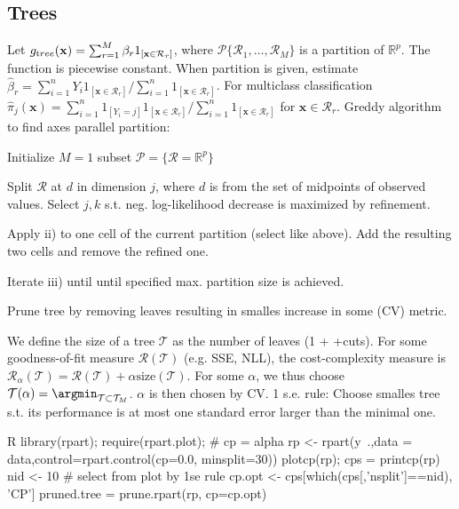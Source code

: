 \subsection{Trees}%
\label{sub:trees}
\begin{sectionbox}\nospacing{}
  Let $g_{\textrm tree}(\mathbf{x}) = \sum_{r=1}^{M}\beta_r 1_{[\mathbf{x}\in \mathcal{R}_r]}$, where $\mathcal{P} \{\mathcal{R}_1,\dots, \mathcal{R}_M\}$ is a partition of $\mathbb{R}^p$.
  The function is piecewise constant.
  When partition is given, estimate $\hat{\beta}_r = \sum_{i=1}^{n}Y_i 1_{[\mathbf{x}\in \mathcal{R}_r]}/\sum_{i=1}^{n}1_{[\mathbf{x}\in \mathcal{R}_r]}$.
  For multiclass classification $\hat{\pi}_j(\mathbf{x}) = \sum_{i=1}^{n}1_{[Y_i =j]} 1_{[\mathbf{x}\in \mathcal{R}_r]}/\sum_{i=1}^{n}1_{[\mathbf{x}\in \mathcal{R}_r]}$ for $\mathbf{x} \in \mathcal{R}_r$.
  Greddy algorithm to find axes parallel partition:
  \begin{enumeratenosep}[label=\roman*]
    \item Initialize $M=1$ subset $\mathcal{P} = \{\mathcal{R} = \mathbb{R}^p\}$
    \item Split $\mathcal{R}$ at $d$ in dimension $j$, where $d$ is from the set of midpoints of observed values.
      Select $j,k$ s.t. neg. log-likelihood decrease is maximized by refinement.
    \item Apply ii) to one cell of the current partition (select like above).
      Add the resulting two cells and remove the refined one. 
    \item Iterate iii) until until specified max. partition size is achieved.
    \item Prune tree by removing leaves resulting in smalles increase in some (CV) metric.
  \end{enumeratenosep}
  We define the size of a tree $\mathcal{T}$ as the number of leaves (1 + +cuts).
  For some goodness-of-fit measure $\mathcal{R}(\mathcal{T})$ (e.g. SSE, NLL), the cost-complexity measure is $\mathcal{R}_{\alpha}(\mathcal{T})=\mathcal{R}(\mathcal{T}) + \alpha \text{size}(\mathcal{T}) $.
  For some $\alpha$, we thus choose $\mathcal{T}(\alpha) = \argmin_{\mathcal{T}\subset\mathcal{T}_M}$.
  $\alpha$ is then chosen by CV. 1 s.e. rule: Choose smalles tree s.t. its performance is at most one standard error larger than the minimal one. 
\end{sectionbox}
\begin{mintlinebox}{R}
  library(rpart); require(rpart.plot); 
  # cp = alpha
  rp <- rpart(y~.,data = data,control=rpart.control(cp=0.0, minsplit=30))
  plotcp(rp); cps = printcp(rp)
  nid <- 10 # select from plot by 1se rule
  cp.opt <- cps[which(cps[,'nsplit']==nid), 'CP']
  pruned.tree = prune.rpart(rp, cp=cp.opt)
\end{mintlinebox}


